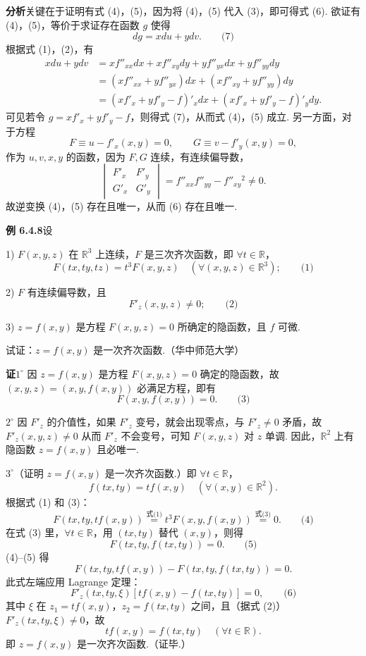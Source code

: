 \documentclass[UTF8,12pt,a4paper,fontset=fandol]{ctexart}
\begin{document}
\noindent\textbf{分析}\quad 关键在于证明有式 (4)，(5)，因为将 (4)，(5) 代入 (3)，即可得式 (6). 欲证有 (4)，(5)，等价于求证存在函数 $g$ 使得
\[
  dg=xdu+ydv. \qquad\text{(7)}
\]
根据式 (1)，(2)，有
\[
\begin{aligned}
  xdu+ydv
  &=
  x f''_{xx}dx+xf''_{xy}dy+yf''_{yx}dx+yf''_{yy}dy \\
  &=(xf''_{xx}+yf''_{yx})dx+(xf''_{xy}+yf''_{yy})dy \\
  &=(xf'_x+yf'_y-f)'_x dx+(xf'_x+yf'_y-f)'_y dy.
\end{aligned}
\]
可见若令 $g=xf'_x+yf'_y-f$，则得式 (7)，从而式 (4)，(5) 成立. 另一方面，对于方程
\[
  F\equiv u-f'_x(x,y)=0,\qquad
  G\equiv v-f'_y(x,y)=0,
\]
作为 $u,v,x,y$ 的函数，因为 $F,G$ 连续，有连续偏导数，
\[
  \begin{vmatrix}
    F'_x & F'_y\\
    G'_x & G'_y
  \end{vmatrix}
  =
  f''_{xx}f''_{yy}-f''_{xy}{}^2\ne0.
\]
故逆变换 (4)，(5) 存在且唯一，从而 (6) 存在且唯一.

\noindent\textbf{例 6.4.8}\quad 设

1) $F(x,y,z)$ 在 $\mathbb R^3$ 上连续，$F$ 是三次齐次函数，即 $\forall t\in\mathbb R$，
\[
  F(tx,ty,tz)=t^3F(x,y,z)\quad(\forall (x,y,z)\in\mathbb R^3); \qquad\text{(1)}
\]

2) $F$ 有连续偏导数，且
\[
  F'_z(x,y,z)\ne0; \qquad\text{(2)}
\]

3) $z=f(x,y)$ 是方程 $F(x,y,z)=0$ 所确定的隐函数，且 $f$ 可微.

\noindent 试证：$z=f(x,y)$ 是一次齐次函数.（华中师范大学）

\noindent\textbf{证}\quad $1^\circ$ 因 $z=f(x,y)$ 是方程 $F(x,y,z)=0$ 确定的隐函数，故 $(x,y,z)=(x,y,f(x,y))$ 必满足方程，即有
\[
  F(x,y,f(x,y))=0. \qquad\text{(3)}
\]

$2^\circ$ 因 $F'_z$ 的介值性，如果 $F'_z$ 变号，就会出现零点，与 $F'_z\ne0$ 矛盾，故 $F'_z(x,y,z)\ne0$ 从而 $F'_z$ 不会变号，可知 $F(x,y,z)$ 对 $z$ 单调. 因此，$\mathbb R^2$ 上有隐函数 $z=f(x,y)$ 且必唯一.

$3^\circ$（证明 $z=f(x,y)$ 是一次齐次函数.）即 $\forall t\in\mathbb R$，
\[
  f(tx,ty)=tf(x,y)\quad(\forall(x,y)\in\mathbb R^2).
\]
根据式 (1) 和 (3)：
\[
  F(tx,ty,tf(x,y))\overset{\text{式(1)}}{=}t^3F(x,y,f(x,y))
  \overset{\text{式(3)}}{=}0. \qquad\text{(4)}
\]
在式 (3) 里，$\forall t\in\mathbb R$，用 $(tx,ty)$ 替代 $(x,y)$，则得
\[
  F(tx,ty,f(tx,ty))=0. \qquad\text{(5)}
\]
(4)--(5) 得
\[
  F(tx,ty,tf(x,y))-F(tx,ty,f(tx,ty))=0.
\]
此式左端应用 Lagrange 定理：
\[
  F'_z(tx,ty,\xi)[tf(x,y)-f(tx,ty)]=0, \qquad\text{(6)}
\]
其中 $\xi$ 在 $z_1=tf(x,y)$，$z_2=f(tx,ty)$ 之间，且（据式 (2)）$F'_z(tx,ty,\xi)\ne0$，故
\[
  tf(x,y)=f(tx,ty)\quad(\forall t\in\mathbb R).
\]
即 $z=f(x,y)$ 是一次齐次函数.（证毕.）
\end{document}
